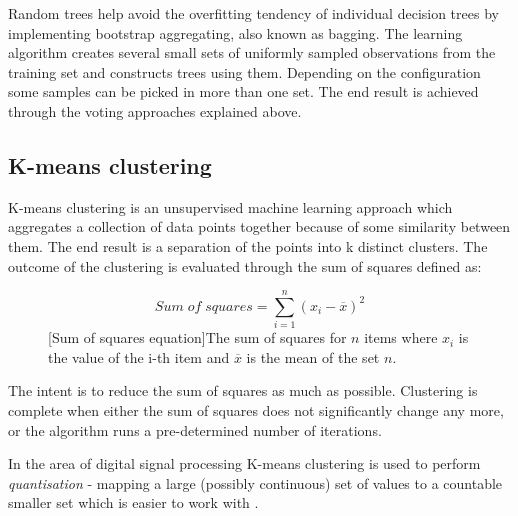 Random trees help avoid the overfitting tendency of individual decision trees by
implementing bootstrap aggregating, also known as bagging. The learning
algorithm creates several small sets of uniformly sampled observations from the
training set and constructs trees using them. Depending on the configuration
some samples can be picked in more than one set. The end result is achieved
through the voting approaches explained above.

\subsection{K-means clustering}
\label{subsec:kmeansclustering}
K-means clustering is an unsupervised machine learning approach which aggregates
a collection of data points together because of some similarity between them.
The end result is a separation of the points into k distinct
clusters. The outcome of the clustering is evaluated through the sum of squares
defined as:
\begin{figure}[H]
   \begin{equation}
        Sum\;of\;squares = \sum_{i=1}^{n}(x_i - \overline{x})^2
   \end{equation} 
   [Sum of squares equation]{The sum of squares for $n$ items where $x_i$ is the value of the i-th item and $\overline{x}$ is the mean of the set $n$.}
   \label{fig:sumofsquares}
\end{figure}

The intent is to reduce the sum of squares as much as possible. Clustering is
complete when either the sum of squares does not significantly change any more,
or the algorithm runs a pre-determined number of iterations.

In the area of digital signal processing K-means clustering is used to perform 
\textit{quantisation} - mapping a large (possibly continuous) set of values to a
countable smaller set which is easier to work with \cite{wiki:quantisation}.


